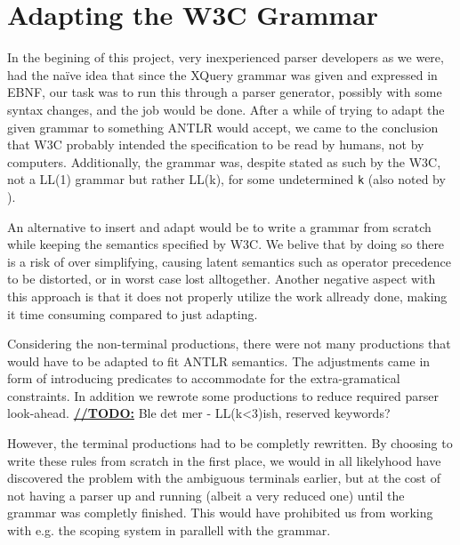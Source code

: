 \section{Adapting the W3C Grammar}
\label{sect:discussion:adaptW3C}

In the begining of this project, very inexperienced parser developers as we
were, had the na\"{i}ve idea that since the XQuery grammar was given and
expressed in EBNF, our task was to run this through a parser generator,
possibly with some syntax changes, and the job would be done. After a while of
trying to adapt the given grammar to something ANTLR would accept, we came to
the conclusion that W3C probably intended the specification to be read by
humans, not by computers. Additionally, the grammar was, despite stated as such
by the W3C, not a LL(1) grammar but rather LL(k), for some undetermined \verb!k!
(also noted by \cite{kang_xquery_diglib}).

An alternative to insert and adapt would be to write a grammar from scratch while keeping the semantics specified by W3C. We belive that by doing so there is a risk of over simplifying, causing latent semantics such as operator precedence to be distorted, or in worst case lost alltogether. Another negative aspect with this approach is that it does not properly utilize the work allready done, making it time consuming compared to just adapting.

Considering the non-terminal productions, there were not many productions that would have to be adapted to fit ANTLR semantics. The adjustments came in form of introducing predicates to accommodate for the extra-gramatical constraints. In addition we rewrote some productions to reduce required parser look-ahead. \underline{\textbf{\LARGE //TODO:}} Ble det mer - LL(k<3)ish, reserved keywords?

However, the terminal productions had to be completly rewritten. By choosing to write these rules from scratch in the first place, we would in all likelyhood have discovered the problem with the ambiguous terminals earlier, but at the cost of not having a parser up and running (albeit a very reduced one) until the grammar was completly finished. This would have prohibited us from working with e.g. the scoping system in parallell with the grammar.
